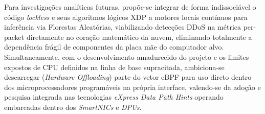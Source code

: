 \documentclass[conference]{IEEEtran}
\begin{document}
Para investigações analíticas futuras, propõe-se integrar de forma indissociável o código \textit{lockless} e seus algoritmos lógicos XDP a motores locais contínuos para inferência via Florestas Aleatórias, viabilizando detecções DDoS na métrica per-packet diretamente no coração matemático da nuvem, eliminando totalmente a dependência frágil de componentes da placa mãe do computador alvo. Simultaneamente, com o desenvolvimento amadurecido do projeto e os limites expostos de CPU definidos na linha de base supracitada, ambiciona-se descarregar (\textit{Hardware Offloading}) parte do vetor eBPF para uso direto dentro dos microprocessadores programáveis na própria interface, valendo-se da adoção e pesquisa integrada nas tecnologias \textit{eXpress Data Path Hints} operando embarcadas dentro dos \textit{SmartNICs} e \textit{DPUs}.



\end{document}
